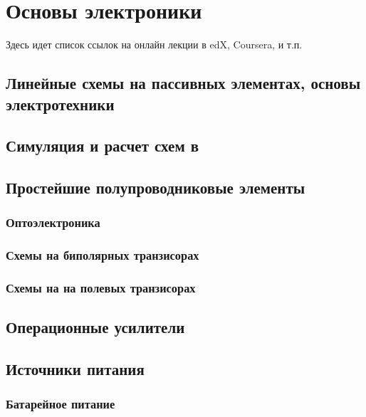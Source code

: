

\tableofcontents\clearpage





\part{Основы электроники}

Здесь идет список ссылок на онлайн лекции в edX, Coursera, и т.п.

\chapter{Линейные схемы на пассивных элементах, основы электротехники}

\chapter{Симуляция и расчет схем в \spice}



\chapter{Простейшие полупроводниковые элементы}

\section{Оптоэлектроника}

\section{Схемы на биполярных транзисорах} 

\section{Схемы на на полевых транзисорах}

\chapter{Операционные усилители}

\chapter{Источники питания}

\section{Батарейное питание}

